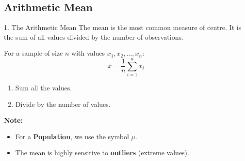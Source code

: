 \subsection{Arithmetic Mean}
\begin{frame}{1. The Arithmetic Mean}
    The mean is the most common measure of centre. It is the sum of all values divided by the number of observations.

    \begin{definition}
        For a sample of size $n$ with values $x_1, x_2, \dots, x_n$:
        \begin{equation}
            \bar{x} = \frac{1}{n} \sum_{i=1}^{n} x_i
        \end{equation}
    \end{definition}
    
    \pause
    
    \begin{recipe}
        \begin{enumerate}
            \item Sum all the values.
            \item Divide by the number of values.
        \end{enumerate}
    \end{recipe}

    \textbf{Note:}
    \begin{itemize}
        \item For a \textbf{Population}, we use the symbol $\mu$.
        \item The mean is highly sensitive to \textbf{outliers} (extreme values).
    \end{itemize}
\end{frame}


